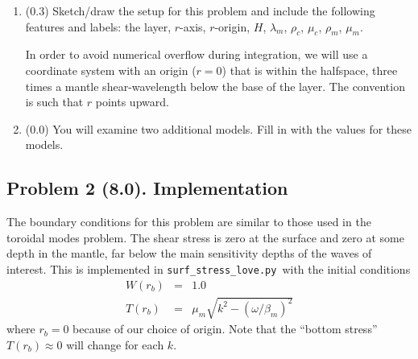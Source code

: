 \documentclass[11pt,titlepage,fleqn]{article}
\newcommand{\tfileBB}{{\tt surf\_stress\_love.py}}
\begin{document}
\begin{enumerate}
\begin{enumerate}
\end{enumerate}

\label{prob:model1}


\item (0.3) Sketch/draw the setup for this problem and include the following features and labels: the layer, $r$-axis, $r$-origin, $H$, $\lambda_m$, $\rho_c$, $\mu_c$, $\rho_m$, $\mu_m$.

In order to avoid numerical overflow during integration, we will use a coordinate system with an origin ($r = 0$) that is within the halfspace, three times a mantle shear-wavelength below the base of the layer. The convention is such that $r$ points upward.

\label{prob:setup}


\item (0.0) You will examine two additional models. Fill in  with the values for these models.

\end{enumerate}


\subsection*{Problem 2 (8.0). Implementation}

The boundary conditions for this problem are similar to those used in the toroidal modes problem. The shear stress is zero at the surface and zero at some depth in the mantle, far below the main sensitivity depths of the waves of interest. This is implemented in \tfileBB\ with the initial conditions
%
\begin{eqnarray}
W(r_b) &=& 1.0
\label{Wbase}
\\
T(r_b) &=& \mu_m \sqrt{k^2 - (\omega/\beta_m)^2}
\label{Tbase}
\end{eqnarray}
%
where $r_b = 0$ because of our choice of origin. Note that the ``bottom stress'' $T(r_b) \approx 0$ will change for each $k$.
%
%

\end{document}

